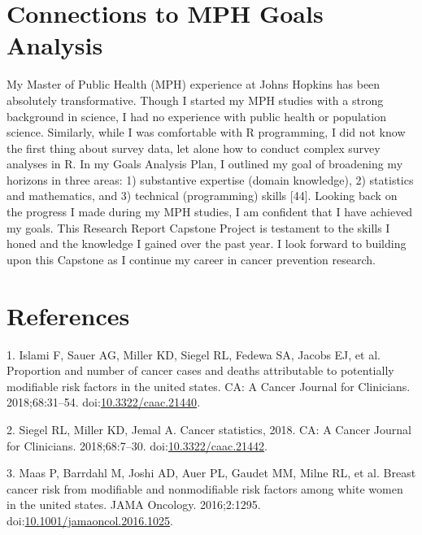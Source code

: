 \documentclass[12pt,oneside]{reedthesis}
\theoremstyle{definition}
\theoremstyle{definition}
\theoremstyle{definition}
\theoremstyle{remark}
\begin{document}
\hypertarget{connections-to-mph-goals-analysis}{%
\section*{Connections to MPH Goals
Analysis}\label{connections-to-mph-goals-analysis}}

My Master of Public Health (MPH) experience at Johns Hopkins has been
absolutely transformative. Though I started my MPH studies with a strong
background in science, I had no experience with public health or
population science. Similarly, while I was comfortable with R
programming, I did not know the first thing about survey data, let alone
how to conduct complex survey analyses in R. In my Goals Analysis Plan,
I outlined my goal of broadening my horizons in three areas: 1)
substantive expertise (domain knowledge), 2) statistics and mathematics,
and 3) technical (programming) skills {[}44{]}. Looking back on the
progress I made during my MPH studies, I am confident that I have
achieved my goals. This Research Report Capstone Project is testament to
the skills I honed and the knowledge I gained over the past year. I look
forward to building upon this Capstone as I continue my career in cancer
prevention research.

\hypertarget{references}{%
\section*{References}\label{references}}

\hypertarget{refs}{}
\leavevmode\hypertarget{ref-Islami_2018}{}%
1. Islami F, Sauer AG, Miller KD, Siegel RL, Fedewa SA, Jacobs EJ, et
al. Proportion and number of cancer cases and deaths attributable to
potentially modifiable risk factors in the united states. CA: A Cancer
Journal for Clinicians. 2018;68:31--54.
doi:\href{https://doi.org/10.3322/caac.21440}{10.3322/caac.21440}.

\leavevmode\hypertarget{ref-Siegel_2018}{}%
2. Siegel RL, Miller KD, Jemal A. Cancer statistics, 2018. CA: A Cancer
Journal for Clinicians. 2018;68:7--30.
doi:\href{https://doi.org/10.3322/caac.21442}{10.3322/caac.21442}.

\leavevmode\hypertarget{ref-Maas_2016}{}%
3. Maas P, Barrdahl M, Joshi AD, Auer PL, Gaudet MM, Milne RL, et al.
Breast cancer risk from modifiable and nonmodifiable risk factors among
white women in the united states. JAMA Oncology. 2016;2:1295.
doi:\href{https://doi.org/10.1001/jamaoncol.2016.1025}{10.1001/jamaoncol.2016.1025}.
\end{document}
